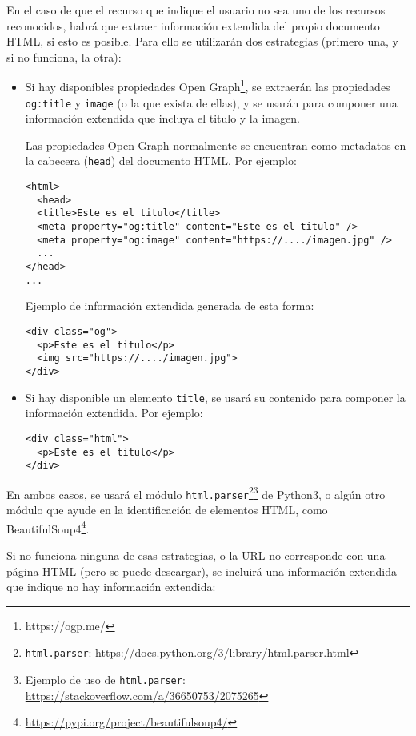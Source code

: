 En el caso de que el recurso que indique el usuario no sea uno de los recursos reconocidos, habrá que extraer información extendida del propio documento HTML, si esto es posible. Para ello se utilizarán dos estrategias (primero una, y si no funciona, la otra):

\begin{itemize}
\item Si hay disponibles propiedades Open Graph\footnote{https://ogp.me/}, se extraerán las propiedades \texttt{og:title} y \texttt{image} (o la que exista de ellas), y se usarán para componer una información extendida que incluya el titulo y la imagen.

  Las propiedades Open Graph normalmente se encuentran como metadatos en la cabecera (\texttt{head}) del documento HTML. Por ejemplo:

\begin{verbatim}
<html>
  <head>
  <title>Este es el titulo</title>
  <meta property="og:title" content="Este es el titulo" />
  <meta property="og:image" content="https://..../imagen.jpg" />
  ...
</head>
...
\end{verbatim}

  Ejemplo de información extendida generada de esta forma:

\begin{verbatim}
<div class="og">
  <p>Este es el titulo</p>
  <img src="https://..../imagen.jpg">
</div>
\end{verbatim}

\item Si hay disponible un elemento \texttt{title}, se usará su contenido para componer la información extendida. Por ejemplo:

\begin{verbatim}
<div class="html">
  <p>Este es el titulo</p>
</div>
\end{verbatim}
  
\end{itemize}

En ambos casos, se usará el módulo \texttt{html.parser}\footnote{\texttt{html.parser}: \url{https://docs.python.org/3/library/html.parser.html}}\footnote{Ejemplo de uso de \texttt{html.parser}: \url{https://stackoverflow.com/a/36650753/2075265}} de Python3, o algún otro módulo que ayude en la identificación de elementos HTML, como BeautifulSoup4\footnote{\url{https://pypi.org/project/beautifulsoup4/}}.

Si no funciona ninguna de esas estrategias, o la URL no corresponde con una página HTML (pero se puede descargar), se incluirá una información extendida que indique no hay información extendida:

